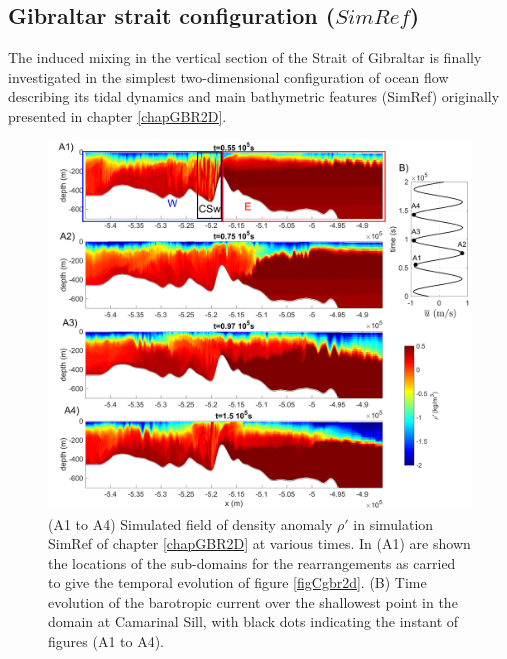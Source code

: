 \subsection{Gibraltar strait configuration ($SimRef$)}
The induced mixing in the vertical section of the Strait of Gibraltar is finally investigated in the simplest two-dimensional configuration of ocean flow describing its tidal dynamics and main bathymetric features (SimRef) originally presented in chapter \ref{chapGBR2D}.
\begin{figure}[h!]
\centering
\includegraphics[width=1\textwidth]{./CHAP_BPE/Fig_Kappa_CS_ex.png}
\caption[Field of density anomaly in SimRef and definition of sub-domains.]{(A1 to A4) Simulated field of density anomaly $\rho'$ in simulation SimRef of chapter \ref{chapGBR2D} at various times. In (A1) are shown the locations of the sub-domains for the rearrangements as carried to give the temporal evolution of figure \ref{figCgbr2d}. (B) Time evolution of the barotropic current over the shallowest point in the domain at Camarinal Sill, with black dots indicating the instant of figures (A1 to A4).}
\label{figCgbr2d_ex}
\end{figure}
